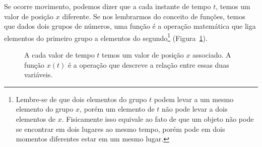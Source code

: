 Se ocorre movimento, podemos dizer que a cada instante de tempo $t$, temos um valor de posição $x$ diferente. Se nos lembrarmos do conceito de funções, temos que dados dois grupos de números, uma função é a operação matemática que liga elementos do primeiro grupo a elementos do segundo\footnote[][-4cm]{Lembre-se de que dois elementos do grupo $t$ podem levar a um mesmo elemento do grupo $x$, porém um elemento de $t$ não pode levar a dois elementos de $x$. Fisicamente isso equivale ao fato de que um objeto não pode se encontrar em dois lugares ao mesmo tempo, porém pode em dois momentos diferentes estar em um mesmo lugar.} (Figura~\ref{Fig:DefFuncaoPosicaoDoTempo}).
\begin{figure}\forcerectofloat
\centering
{}
\caption{A cada valor de tempo $t$ temos um valor de posição $x$ associado. A função $x(t)$ é a operação que descreve a relação entre essas duas variáveis.\label{Fig:DefFuncaoPosicaoDoTempo}}
\end{figure}

